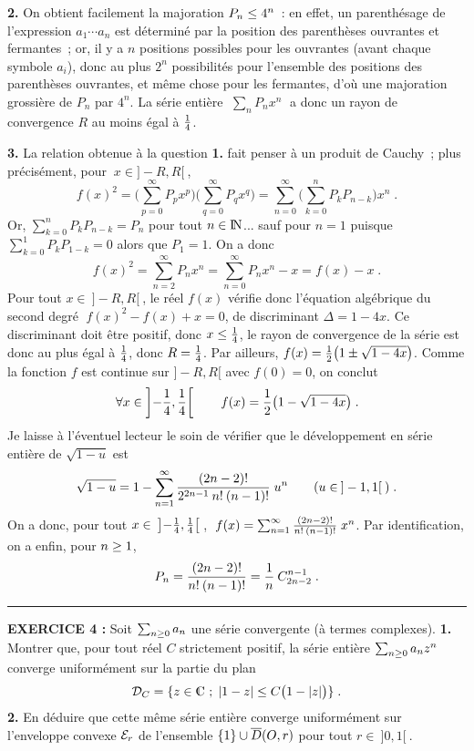 \documentclass{article}
\begin{document}
\msk
{\bf 2.} On obtient facilement la majoration $P_n\leq 4^n$~: en effet, un parenth\'esage de l'expression $a_1\cdots a_n$ est d\'etermin\'e par la position des parenth\`eses ouvrantes et fermantes~; or, il y a $n$ positions possibles pour les ouvrantes (avant chaque symbole $a_i$), donc au plus $2^n$ possibilit\'es pour l'ensemble des positions des parenth\`eses ouvrantes, et m\^eme chose pour les fermantes, d'o\`u une majoration grossi\`ere de $P_n$ par $4^n$. 
La s\'erie enti\`ere $\;\sum_nP_nx^n\;$ a donc un rayon de convergence $R$ au moins \'egal \`a ${1\over4}$.

\msk
{\bf 3.} La relation obtenue \`a la question {\bf 1.} fait penser \`a un produit de Cauchy~; plus pr\'ecis\'ement, pour $\>x\in]-R,R[\>$,\vv
$$f(x)^2  =  \Big(\sum_{p=0}^{\infty}P_px^p\Big)\Big(\sum_{q=0}^{\infty}P_qx^q\Big) = \sum_{n=0}^{\infty}\Big(\sum_{k=0}^nP_kP_{n-k}\Big)x^n\;.$$
Or, $\sum_{k=0}^nP_kP_{n-k}=P_n$ pour tout $n\in{\rm I\kern-0.5mm N}$... sauf pour $n=1$ puisque $\sum_{k=0}^1P_kP_{1-k}=0$ alors que $P_1=1$. On a donc\vv
$$f(x)^2=\sum_{n=2}^{\infty}P_nx^n=\sum_{n=0}^{\infty}P_nx^n-x=f(x)-x\;.$$
Pour tout $x\in\>]-R,R[\>$, le r\'eel $f(x)$ v\'erifie donc l'\'equation alg\'ebrique du second degr\'e $\;f(x)^2-f(x)+x=0$, de discriminant $\Delta=1-4x$. Ce discriminant doit \^etre positif, donc $x\leq{1\over4}$, le rayon de convergence de la s\'erie est donc au plus \'egal \`a ${1\over4}$, donc $R={1\over 4}$. Par ailleurs, $f(x)={1\over2}\big(1\pm\sqrt{1-4x}\big)$. Comme la fonction $f$ est continue sur $]-R,R[$ avec $f(0)=0$, on conclut\vv
$$\forall x\in\left]-{1\over4},{1\over4}\right[\qquad f(x)={1\over2}\big(1-\sqrt{1-4x}\big)\;.$$
Je laisse \`a l'\'eventuel lecteur le soin de v\'erifier que le d\'eveloppement en s\'erie enti\`ere de $\sqrt{1-u}$ est\vv
$$\sqrt{1-u}=1-\sum_{n=1}^{\infty}{(2n-2)!\over 2^{2n-1}\>n!\>(n-1)!}\;u^n\qquad (u\in\>]-1,1[\>)\;.$$
On a donc, pour tout $x\in\>\left]-{1\over4},{1\over4}\right[\>$, $\;f(x)=\sum_{n=1}^{\infty}{(2n-2)!\over n!\>(n-1)!}\;x^n$. Par identification, on a enfin, pour $n\geq1$,\vv
$$P_n={(2n-2)!\over n!\>(n-1)!}={1\over n}\>C_{2n-2}^{n-1}\;.$$


\bsk
\hrule
\bsk

{\bf EXERCICE 4 :}\msk
Soit $\sum_{n\geq0}a_n$ une s\'erie convergente (\`a termes complexes).\msk
{\bf 1.} Montrer que, pour tout r\'eel $C$ strictement positif, la s\'erie enti\`ere $\sum_{n\geq0}a_nz^n$ converge uniform\'ement sur la partie du plan\vv
$${\cal D}_C=\{z\in\cmat\;;\;|1-z|\ie C\big(1-|z|\big)\}\;.$$\ssk
{\bf 2.} En d\'eduire que cette m\^eme s\'erie enti\`ere converge uniform\'ement sur l'enveloppe convexe ${\cal E}_r$ de l'ensemble $\{1\}\cup\overline{D}(O,r)$ pour tout $r\in\>]0,1[\>$.
\end{document}
